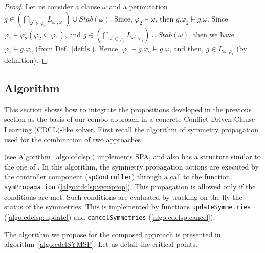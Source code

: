 \begin{proof}
 Let us consider a clause $\omega$ and a permutation $g \in 
 (\underset{\omega^\prime \in \varphi_2}{\bigcap}L_{\omega^\prime,\varphi_1})
 \cup Stab(\omega)$.
 Since, $\varphi_2 \models \omega$, then  $g.\varphi_2 \models g.\omega$. Since $\varphi_1 \models \varphi_2 (\varphi_2 \subseteq \varphi_1)$, and 
 $g \in 
 (\underset{\omega^\prime \in \varphi_2}{\bigcap}L_{\omega^\prime,\varphi_1})
 \cup Stab(\omega)$, then we have $\varphi_1 \models g.\varphi_2$ (from Def.~\ref{def:ls}). Hence, $\varphi_1 \models g.\varphi_2 \models g.\omega$, and then, $g \in L_{\omega,\varphi_1}$ (by definition). 
\end{proof}
\subsection{Algorithm}
This section shows how to integrate the propositions developed in the previous
section as the basis of our combo approach in a concrete
Conflict-Driven Clause Learning (CDCL)-like solver.
First recall the algorithm of symmetry propagation used for the combination of two approaches.

{\cdclsp} (see Algorithm~\ref{algo:cdclsp}) implements SPA, and also has a
structure similar to the one of {\cdcl}. In this algorithm, the symmetry
propagation actions are executed by the controller component (\texttt{spController})
through a call to the function \texttt{symPropagation} (\cref{algo:cdclsp:symprop}). This
propagation is allowed only if the conditions %
are met. Such conditions are evaluated by tracking on-the-fly the status of the
symmetries. This is implemented by functions \texttt{updateSymmetries} (\cref{algo:cdclsp:update})
and \texttt{cancelSymmetries} (\cref{algo:cdclsp:cancel}).
 
The algorithm we propose for the composed approach is presented in
algorithm~\ref{algo:cdclSYMSP}. 
Let us detail the critical points.
